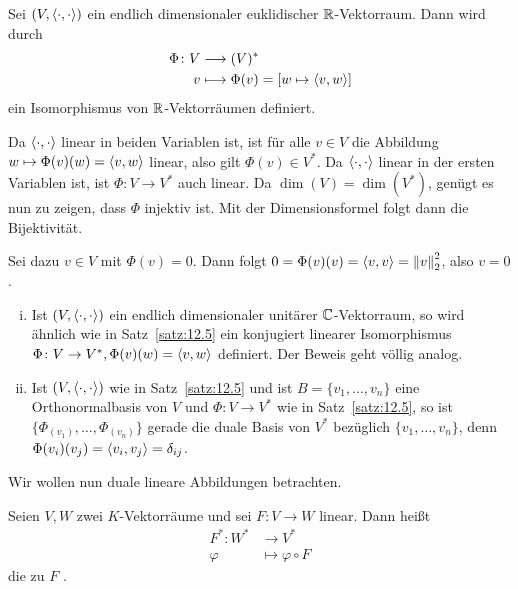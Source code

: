 \begin{satz}
	\label{satz:12.5}
	Sei $(V,\left\langle\cdot,\cdot\right\rangle)$ ein endlich dimensionaler euklidischer $\mathbb{R}$-Vektorraum.
	Dann wird durch
	\begin{align*}
		\Phi \colon V &\longrightarrow (V)^* \\
		v &\longmapsto \Phi(v) = [w \mapsto \left\langle v,w\right\rangle]
	\end{align*}
	ein Isomorphismus von $\mathbb{R}$-Vektorräumen definiert.
\end{satz}

\begin{beweis}
	Da $\left\langle\cdot,\cdot\right\rangle$ linear in beiden Variablen ist, ist für alle $v \in V$ die Abbildung $w \mapsto \Phi(v)(w) = \left\langle v,w\right\rangle$ linear, also gilt $\Phi(v) \in V^*$.
	Da $\left\langle\cdot,\cdot\right\rangle$ linear in der ersten Variablen ist, ist $\Phi \colon V \rightarrow V^*$ auch linear.
	Da $\dim(V) = \dim(V^*)$, genügt es nun zu zeigen, dass $\Phi$ injektiv ist.
	Mit der Dimensionsformel folgt dann die Bijektivität.
	
	Sei dazu $v \in V$ mit $\Phi(v) = 0$.
	Dann folgt $0 = \Phi(v)(v) = \left\langle v,v\right\rangle = \left\lVert v\right\rVert_2^2$, also $v = 0$. 
	
\end{beweis}

\begin{bemerkung}
	\label{bem:12.6}
	\begin{enumerate}[(i)]
		\item Ist $(V,\left\langle\cdot,\cdot\right\rangle)$ ein endlich dimensionaler unitärer $\mathbb{C}$-Vektorraum, so wird ähnlich wie in Satz~\ref{satz:12.5} ein konjugiert linearer Isomorphismus $\Phi \colon V \rightarrow V^*, \Phi(v)(w) = \left\langle v,w\right\rangle$ definiert.
		Der Beweis geht völlig analog.
		\item Ist $(V,\left\langle\cdot,\cdot\right\rangle)$ wie in Satz~\ref{satz:12.5} und ist $B = \{v_1,\dots,v_n\}$ eine Orthonormalbasis von $V$ und $\Phi \colon V \rightarrow V^*$ wie in Satz~\ref{satz:12.5}, so ist $\{\Phi_(v_1),\dots,\Phi_(v_n)\}$ gerade die duale Basis von $V^*$ bezüglich $\{v_1,\dots,v_n\}$, denn $\Phi(v_i)(v_j) = \left\langle v_i,v_j\right\rangle = \delta_{ij}$.
	\end{enumerate}
\end{bemerkung}

Wir wollen nun duale lineare Abbildungen betrachten.

\begin{definition}
	\label{def:12.7}
	Seien $V,W$ zwei $K$-Vektorräume und sei $F \colon V \rightarrow W$ linear.
	Dann heißt
	\begin{align*}
		F^*\colon W^* &\longrightarrow V^* \\
		\varphi &\longmapsto \varphi \circ F
	\end{align*}
	die zu $F$ .
\end{definition}

